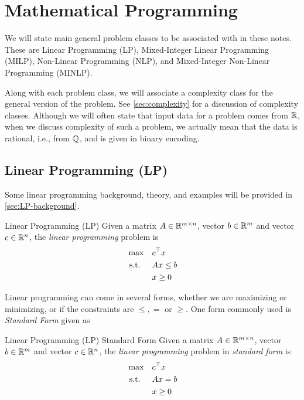 \documentclass[../open-optimization/open-optimization.tex]{subfiles}
\begin{document}
\chapter{Mathematical Programming}

We will state main general problem classes to be associated with in these notes.  These are Linear Programming (LP), Mixed-Integer Linear Programming (MILP), Non-Linear Programming (NLP), and Mixed-Integer Non-Linear Programming (MINLP).  




Along with each problem class, we will associate a complexity class for the general version of the problem.  See \autoref{sec:complexity} for a discussion of complexity classes.  Although we will often state that input data for a problem comes from ${\mathbb{R}}$, when we discuss complexity of such a problem, we actually mean that the data is rational, i.e., from ${\mathbb{Q}}$, and is given in binary encoding.

\section{Linear Programming (LP)}
Some linear programming background, theory, and examples will be provided in \autoref{sec:LP-background}.
\begin{general}{Linear Programming (LP)}{\polynomial}
Given a matrix $A \in {\mathbb{R}}^{m\times n}$, vector $b \in {\mathbb{R}}^m$ and vector $c \in {\mathbb{R}}^n$, the \emph{linear programming} problem is
\begin{equation}
\label{eq:LP}
\begin{split}
\max \quad & c^\top x\\
\text{ s.t. }  \quad & Ax \leq b\\
& x \geq 0
\end{split}
\end{equation}
\end{general}

Linear programming can come in several forms, whether we are maximizing or minimizing, or if the constraints are $\leq, =$ or $\geq$.   One form commonly used is \emph{Standard Form} given as 
\begin{general}{Linear Programming (LP) Standard Form}{\polynomial}
Given a matrix $A \in {\mathbb{R}}^{m\times n}$, vector $b \in {\mathbb{R}}^m$ and vector $c \in {\mathbb{R}}^n$, the \emph{linear programming} problem in \emph{standard form} is
\begin{equation}
\label{eq:standardLP}
\begin{split}
\max \quad & c^\top x\\
\text{ s.t. }  \quad & Ax = b\\
& x \geq 0
\end{split}
\end{equation}
\end{general}
\end{document}
